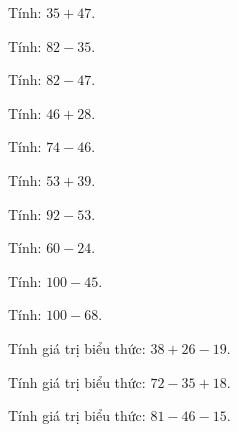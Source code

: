 \begin{ex}
Tính: $35 + 47$.
\end{ex}

\begin{ex}
Tính: $82 - 35$.
\end{ex}

\begin{ex}
Tính: $82 - 47$.
\end{ex}

\begin{ex}
Tính: $46 + 28$.
\end{ex}

\begin{ex}
Tính: $74 - 46$.
\end{ex}

\begin{ex}
Tính: $53 + 39$.
\end{ex}

\begin{ex}
Tính: $92 - 53$.
\end{ex}

\begin{ex}
Tính: $60 - 24$.
\end{ex}

\begin{ex}
Tính: $100 - 45$.
\end{ex}

\begin{ex}
Tính: $100 - 68$.
\end{ex}

\begin{ex}
Tính giá trị biểu thức: $38 + 26 - 19$.
\end{ex}

\begin{ex}
Tính giá trị biểu thức: $72 - 35 + 18$.
\end{ex}

\begin{ex}
Tính giá trị biểu thức: $81 - 46 - 15$.
\end{ex}

